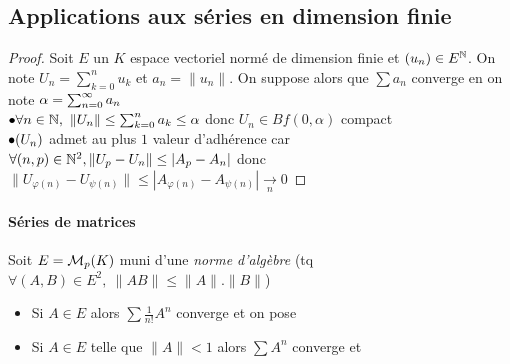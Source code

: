 		 \medskip
		
		 \medskip
		
		 
	\subsection{Applications aux séries en dimension finie}
		
		
		\begin{proof}
		Soit $E$ un $K$ espace vectoriel normé de dimension finie et $(u_n) \in E^{{\mathbb{N}}}$. On note $U_n = \sum_{k=0}^{n} u_k$ et $a_n = \|u_n\|$. On suppose alors que $\sum a_n$ converge en on note $\alpha = \sum_{n=0}^\infty a_n$\\
		$\bullet \forall n\in{\mathbb{N}} ,~\|U_n\| \leq \sum_{k=0}^{n} a_k \leq \alpha$ donc $U_n\in Bf(0,\alpha )$ compact\\
		$\bullet (U_n)$ admet au plus $1$ valeur d'adhérence car $\forall (n,p) \in {\mathbb{N}}^2 ,\\ \|U_p -U_n \| \leq |A_p -A_n |$ donc $\|U_{\varphi (n)} - U_{\psi (n)} \| \leq |A_{\varphi (n)} - A_{\psi (n)} | \underset{n}{\to} 0$ 
		\end{proof} \medskip
		
		\traitd
		\paragraph{Séries de matrices} Soit $E = {\mathcal{M}}_p(K)$ muni d'une \emph{norme d'algèbre} (tq $\forall (A,B) \in E^2 ,~
		\|AB\| \leq \|A\| . \|B\|$)
		\begin{itemize}
			\item Si $A\in E$ alors $\sum \frac{1}{n!} A^n$ converge et on pose 
			\item Si $A\in E$ telle que $\|A\| <1$ alors $\sum A^n$ converge et  
		\end{itemize}
		\trait
	
